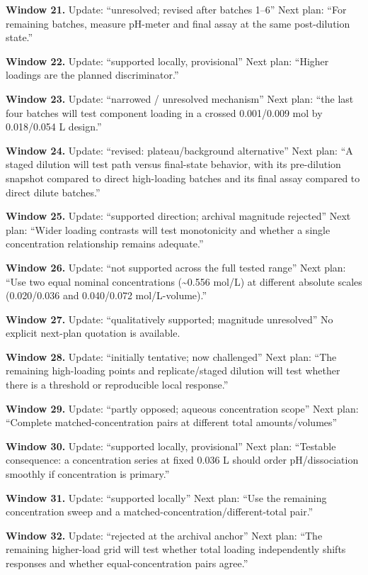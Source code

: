 \documentclass[10pt,a4paper]{article}
\begin{document}
\textbf{Window 21.} Update: ``unresolved; revised after batches 1--6'' Next plan: ``For remaining batches, measure pH-meter and final assay at the same post-dilution state.''

\textbf{Window 22.} Update: ``supported locally, provisional'' Next plan: ``Higher loadings are the planned discriminator.''

\textbf{Window 23.} Update: ``narrowed / unresolved mechanism'' Next plan: ``the last four batches will test component loading in a crossed 0.001/0.009 mol by 0.018/0.054 L design.''

\textbf{Window 24.} Update: ``revised: plateau/background alternative'' Next plan: ``A staged dilution will test path versus final-state behavior, with its pre-dilution snapshot compared to direct high-loading batches and its final assay compared to direct dilute batches.''

\textbf{Window 25.} Update: ``supported direction; archival magnitude rejected'' Next plan: ``Wider loading contrasts will test monotonicity and whether a single concentration relationship remains adequate.''

\textbf{Window 26.} Update: ``not supported across the full tested range'' Next plan: ``Use two equal nominal concentrations (\textasciitilde0.556 mol/L) at different absolute scales (0.020/0.036 and 0.040/0.072 mol/L-volume).''

\textbf{Window 27.} Update: ``qualitatively supported; magnitude unresolved'' No explicit next-plan quotation is available.

\textbf{Window 28.} Update: ``initially tentative; now challenged'' Next plan: ``The remaining high-loading points and replicate/staged dilution will test whether there is a threshold or reproducible local response.''

\textbf{Window 29.} Update: ``partly opposed; aqueous concentration scope'' Next plan: ``Complete matched-concentration pairs at different total amounts/volumes''

\textbf{Window 30.} Update: ``supported locally, provisional'' Next plan: ``Testable consequence: a concentration series at fixed 0.036 L should order pH/dissociation smoothly if concentration is primary.''

\textbf{Window 31.} Update: ``supported locally'' Next plan: ``Use the remaining concentration sweep and a matched-concentration/different-total pair.''

\textbf{Window 32.} Update: ``rejected at the archival anchor'' Next plan: ``The remaining higher-load grid will test whether total loading independently shifts responses and whether equal-concentration pairs agree.''
\end{document}
